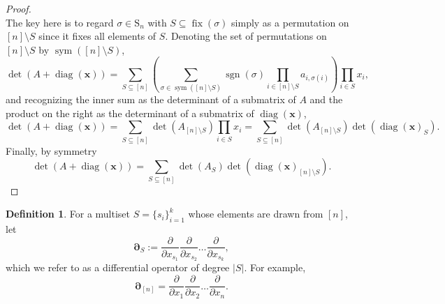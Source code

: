 \documentclass{article}
\newcommand{\diag}{\operatorname{diag}}
\newcommand{\sym}{\operatorname{sym}}
\newcommand{\fix}{\operatorname{fix}}
\newcommand{\sgn}{\operatorname{sgn}}
\newcommand{\Sn}{{\text{S}_n}}
\theoremstyle{theorem}
\theoremstyle{definition}
\newtheorem{defn}[thm]{Definition}
\begin{document}
\begin{proof}
\[    \]
    The key here is to regard $\sigma\in\Sn$ with $S\subseteq\fix(\sigma)$ simply as a permutation on $[n]\setminus S$ since it fixes all elements of $S$. Denoting the set of permutations on $[n]\setminus S$ by $\sym([n]\setminus S)$,
    \[
        \det(A+\diag(\boldsymbol{x}))=\sum_{S\subseteq[n]}\left(\sum_{\sigma\in\sym([n]\setminus S)}\sgn(\sigma)\prod_{i\in[n]\setminus S}a_{i,\sigma(i)}\right)\prod_{i\in S}x_i,
    \]
    and recognizing the inner sum as the determinant of a submatrix of $A$ and the product on the right as the determinant of a submatrix of $\diag(\boldsymbol{x})$,
    \[
        \det(A+\diag(\boldsymbol{x}))=\sum_{S\subseteq[n]}\det(A_{[n]\setminus S})\prod_{i\in S}x_i
        =\sum_{S\subseteq[n]}\det(A_{[n]\setminus S})\det(\diag(\boldsymbol{x})_{S}).
    \]
    Finally, by symmetry
    \[
        \det(A+\diag(\boldsymbol{x}))=\sum_{S\subseteq[n]}\det(A_{S})\det(\diag(\boldsymbol{x})_{[n]\setminus S}).
    \]
\end{proof}

\begin{defn}
    For a multiset $S=\{s_i\}_{i=1}^k$ whose elements are drawn from $[n]$, let
    \[
        \boldsymbol{\partial}_S:=\frac{\partial}{\partial x_{s_1}}\frac{\partial}{\partial x_{s_2}}\hdots\frac{\partial}{\partial x_{s_k}},
    \]
    which we refer to as a differential operator of degree $|S|$. For example,
    \[
        \boldsymbol{\partial}_{[n]}=\frac{\partial}{\partial x_{1}}\frac{\partial}{\partial x_{2}}\hdots\frac{\partial}{\partial x_{n}}.
    \]
\end{defn}
\end{document}
